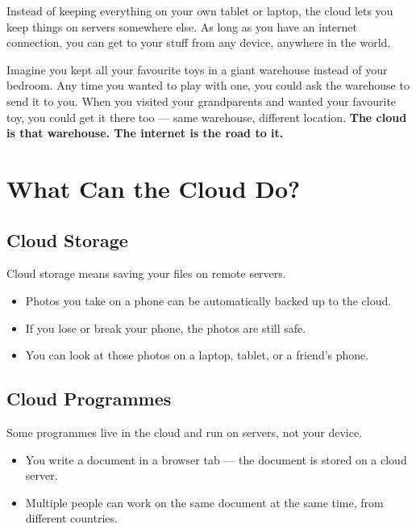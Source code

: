 Instead of keeping everything on your own tablet or laptop,
the cloud lets you keep things on servers somewhere else.
As long as you have an internet connection, you can get to your stuff
from any device, anywhere in the world.

\begin{picturethis}
  Imagine you kept all your favourite toys in a giant warehouse instead of your bedroom.
  Any time you wanted to play with one, you could ask the warehouse to send it to you.
  When you visited your grandparents and wanted your favourite toy,
  you could get it there too — same warehouse, different location.
  \textbf{The cloud is that warehouse. The internet is the road to it.}
\end{picturethis}

\sectionrule

\section*{What Can the Cloud Do?}

\subsection*{Cloud Storage}

Cloud storage means saving your files on remote servers.

\begin{itemize}
  \item Photos you take on a phone can be automatically backed up to the cloud.
  \item If you lose or break your phone, the photos are still safe.
  \item You can look at those photos on a laptop, tablet, or a friend's phone.
\end{itemize}

\subsection*{Cloud Programmes}

Some programmes live in the cloud and run on servers, not your device.

\begin{itemize}
  \item You write a document in a browser tab — the document is stored on a cloud server.
  \item Multiple people can work on the same document at the same time, from different countries.
\end{itemize}

